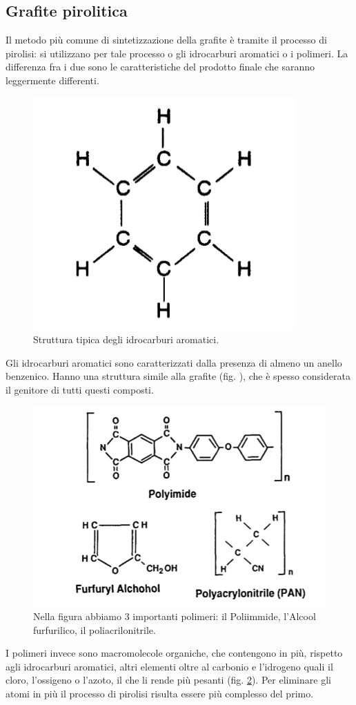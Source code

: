 \documentclass[a4paper,titlepage]{book}
\begin{document}
\subsection{Grafite pirolitica}
Il metodo più comune di sintetizzazione della grafite è tramite il processo di pirolisi: si utilizzano per tale processo o gli idrocarburi aromatici o i polimeri. La differenza fra i due sono le caratteristiche del prodotto finale che saranno leggermente differenti.
\begin{figure}[h!] 
	\centering
	\includegraphics[width=0.5\columnwidth]{idrocarburi.png}
	\caption{ 	\label{idro}
		Struttura tipica degli idrocarburi aromatici.
	}
\end{figure}
Gli idrocarburi aromatici sono caratterizzati dalla presenza di almeno un anello benzenico. Hanno una struttura simile alla grafite (fig. \label{idro}), che è spesso considerata il genitore di tutti questi composti.
\begin{figure}[h!] 
	\centering
	\includegraphics[width=0.8\columnwidth]{polymers.png}
	\caption{ 	\label{poly}
		 Nella figura abbiamo 3 importanti polimeri: il Poliimmide, l'Alcool furfurilico, il poliacrilonitrile.
	}
\end{figure}
I polimeri invece sono macromolecole organiche, che contengono in più, rispetto agli idrocarburi aromatici, altri elementi oltre al carbonio e l'idrogeno quali il cloro, l'ossigeno o l'azoto, il che li rende più pesanti (fig. \ref{poly}). Per eliminare gli atomi in più il processo di pirolisi risulta essere più complesso del primo.
\end{document}
